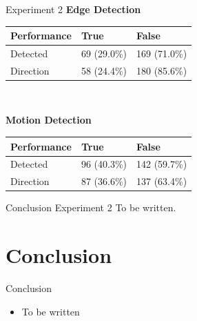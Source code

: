 \documentclass{beamer}
\begin{document}
\begin{frame}
\begin{block}{Experiment 2}
\textbf{Edge Detection}\\\vspace{0.1cm}

\begin{tabular}{| l | l | l |}
\hline
\textbf{Performance} & True & False\\
\hline
Detected  & 69 (29.0\%) & 169 (71.0\%)\\
\hline
Direction & 58 (24.4\%) & 180 (85.6\%) \\
\hline
\end{tabular}\\\vspace{0.1cm}

\textbf{Motion Detection}\\\vspace{0.1cm}

\begin{tabular}{| l | l | l |}
\hline
\textbf{Performance} & True & False\\
\hline
Detected  & 96 (40.3\%) & 142 (59.7\%)\\
\hline
Direction & 87 (36.6\%) & 137 (63.4\%) \\
\hline
\end{tabular}
\end{block}

\end{frame}

\begin{frame}
\begin{block}{Conclusion Experiment 2}
To be written.
\end{block}
\end{frame}


\section{Conclusion}
\begin{frame}
\begin{block}{Conclusion}
\begin{itemize}
\item To be written
\end{itemize}
\end{block}
\end{frame}
\end{document}

